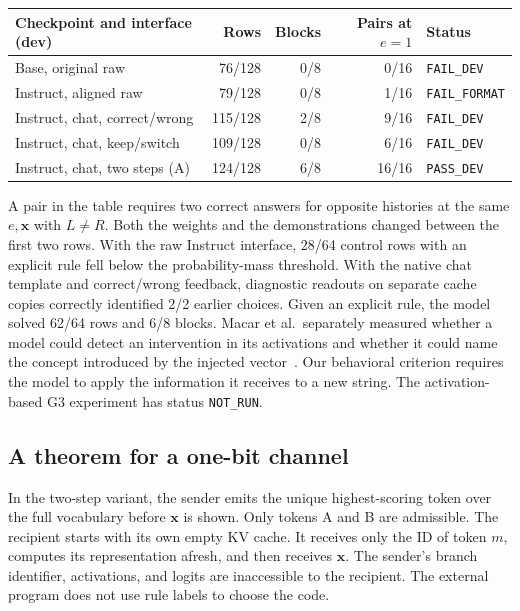 \begin{center}\small
\begin{tabularx}{\linewidth}{@{}Xrrrl@{}}\toprule
Checkpoint and interface (dev) & Rows & Blocks & Pairs at $e=1$ & Status \\\midrule
Base, original raw & 76/128 & 0/8 & 0/16 & \texttt{FAIL\_DEV}\\
Instruct, aligned raw & 79/128 & 0/8 & 1/16 & \texttt{FAIL\_FORMAT}\\
Instruct, chat, correct/wrong & 115/128 & 2/8 & 9/16 & \texttt{FAIL\_DEV}\\
Instruct, chat, keep/switch & 109/128 & 0/8 & 6/16 & \texttt{FAIL\_DEV}\\
Instruct, chat, two steps (A) & 124/128 & 6/8 & 16/16 & \texttt{PASS\_DEV}\\
\bottomrule\end{tabularx}
\end{center}
A pair in the table requires two correct answers for opposite histories at the same $e,\mathbf{x}$ with $L\ne R$. Both the weights and the demonstrations changed between the first two rows. With the raw Instruct interface, 28/64 control rows with an explicit rule fell below the probability-mass threshold. With the native chat template and correct/wrong feedback, diagnostic readouts on separate cache copies correctly identified 2/2 earlier choices. Given an explicit rule, the model solved 62/64 rows and 6/8 blocks. Macar et al.\ separately measured whether a model could detect an intervention in its activations and whether it could name the concept introduced by the injected vector~\cite{macar2026}. Our behavioral criterion requires the model to apply the information it receives to a new string. The activation-based G3 experiment has status \texttt{NOT\_RUN}.

\subsection{A theorem for a one-bit channel}
In the two-step variant, the sender emits the unique highest-scoring token over the full vocabulary before $\mathbf{x}$ is shown. Only tokens A and B are admissible. The recipient starts with its own empty KV cache. It receives only the ID of token $m$, computes its representation afresh, and then receives $\mathbf{x}$. The sender's branch identifier, activations, and logits are inaccessible to the recipient. The external program does not use rule labels to choose the code.


